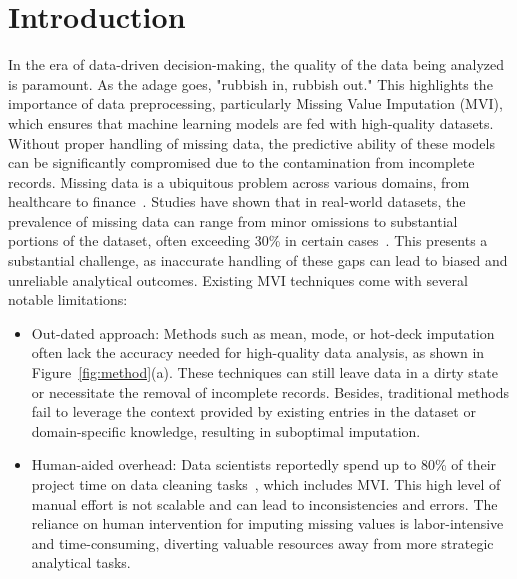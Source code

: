 \documentclass[sigconf]{acmart}
\begin{document}
\section{Introduction}
In the era of data-driven decision-making, the quality of the data being analyzed is paramount. As the adage goes, "rubbish in, rubbish out." This highlights the importance of data preprocessing, particularly Missing Value Imputation (MVI), which ensures that machine learning models are fed with high-quality datasets. Without proper handling of missing data, the predictive ability of these models can be significantly compromised due to the contamination from incomplete records. Missing data is a ubiquitous problem across various domains, from healthcare to finance~\cite{andridge2010review,emmanuel2021survey}. Studies have shown that in real-world datasets, the prevalence of missing data can range from minor omissions to substantial portions of the dataset, often exceeding 30\% in certain cases~\cite{emmanuel2021survey}. This presents a substantial challenge, as inaccurate handling of these gaps can lead to biased and unreliable analytical outcomes. Existing MVI techniques come with several notable limitations:

\begin{itemize}
  \item Out-dated approach:
  Methods such as mean, mode, or hot-deck imputation~\cite{andridge2010review,little2019statistical} often lack the accuracy needed for high-quality data analysis, as shown in Figure~\ref{fig:method}(a). These techniques can still leave data in a dirty state or necessitate the removal of incomplete records. Besides, traditional methods fail to leverage the context provided by existing entries in the dataset or domain-specific knowledge, resulting in suboptimal imputation.
  \item Human-aided overhead:
  Data scientists reportedly spend up to 80\% of their project time on data cleaning tasks~\cite{emmanuel2021survey}, which includes MVI. This high level of manual effort is not scalable and can lead to inconsistencies and errors. The reliance on human intervention for imputing missing values is labor-intensive and time-consuming, diverting valuable resources away from more strategic analytical tasks.
\end{itemize}
\end{document}
